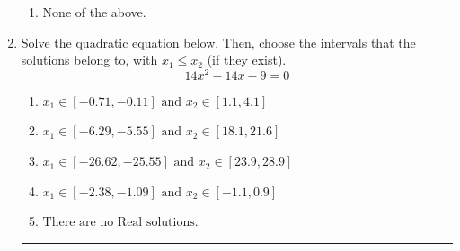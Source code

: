 \documentclass[14pt]{extbook}
\newcommand{\litem}[1]{\item#1\hspace*{-1cm}\rule{\textwidth}{0.4pt}}
\begin{document}
\begin{enumerate}
{\begin{enumerate}[label=\Alph*.]
\item None of the above.
\end{enumerate} }
\litem{
Solve the quadratic equation below. Then, choose the intervals that the solutions belong to, with $x_1 \leq x_2$ (if they exist).\[ 14x^{2} -14 x -9 = 0 \]\begin{enumerate}[label=\Alph*.]
\item \( x_1 \in [-0.71, -0.11] \text{ and } x_2 \in [1.1, 4.1] \)
\item \( x_1 \in [-6.29, -5.55] \text{ and } x_2 \in [18.1, 21.6] \)
\item \( x_1 \in [-26.62, -25.55] \text{ and } x_2 \in [23.9, 28.9] \)
\item \( x_1 \in [-2.38, -1.09] \text{ and } x_2 \in [-1.1, 0.9] \)
\item \( \text{There are no Real solutions.} \)


\end{enumerate}}
\end{enumerate}
\end{document}
